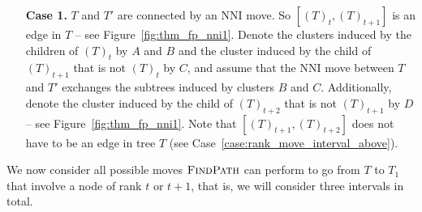 \documentclass[11pt]{amsart}
\newcommand{\findpath}{\textsc{FindPath}}
\newcommand{\nni}{\mathrm{NNI}}
\begin{document}
\begin{enumerate}
\item[\textbf{Case 1.}]
$T$ and $T'$ are connected by an $\nni$ move.
So $[(T)_t,(T)_{t+1}]$ is an edge in $T$ -- see Figure~\ref{fig:thm_fp_nni1}.
Denote the clusters induced by the children of $(T)_t$ by $A$ and $B$ and the cluster induced by the child of $(T)_{t+1}$ that is not $(T)_t$ by $C$, and assume that the $\nni$ move between $T$ and $T'$ exchanges the subtrees induced by clusters $B$ and $C$.
Additionally, denote the cluster induced by the child of $(T)_{t+2}$ that is not $(T)_{t+1}$ by $D$ -- see Figure~\ref{fig:thm_fp_nni1}.
Note that $[(T)_{t+1}, (T)_{t+2}]$ does not have to be an edge in tree $T$ (see Case~\ref{case:rank_move_interval_above}).
\end{enumerate}

We now consider all possible moves $\findpath$ can perform to go from $T$ to $T_1$ that involve a node of rank $t$ or $t+1$, that is, we will consider three intervals in total.
\end{document}
